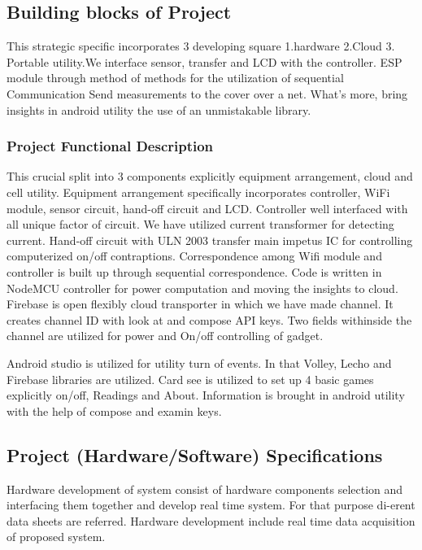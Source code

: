 \documentclass[12pt,a4paper]{article}
\begin{document}
\subsection{Building blocks of Project}
\hspace{0.5cm}This strategic specific incorporates 3 developing square 1.hardware 2.Cloud 3. Portable utility.We interface sensor, transfer and LCD with the controller. ESP module through method of methods for the utilization of sequential Communication Send measurements to the cover over a net. What's more, bring insights in android utility the use of an unmistakable library.\\

\subsubsection{Project Functional Description }
\hspace{0.5cm}This crucial split into 3 components explicitly equipment arrangement, cloud and cell utility. Equipment arrangement specifically incorporates controller, WiFi module, sensor circuit, hand-off circuit and LCD. Controller well interfaced with all unique factor of circuit. We have utilized current transformer for detecting current. Hand-off circuit with ULN 2003 transfer main impetus IC for controlling computerized on/off contraptions. Correspondence among Wifi module and controller is built up through sequential correspondence. Code is written in NodeMCU controller for power computation and moving the insights to cloud.\\

Firebase is open flexibly cloud transporter in which we have made channel. It creates channel ID with look at and compose API keys. Two fields withinside the channel are utilized for power and On/off controlling of gadget. 

Android studio is utilized for utility turn of events. In that Volley, Lecho and Firebase libraries are utilized. Card see is utilized to set up 4 basic games explicitly on/off, Readings and About. Information is brought in android utility with the help of compose and examin keys.

\subsection{Project (Hardware/Software) Specifications}
\hspace{0.5cm} Hardware development of system consist of hardware components selection and interfacing them together and develop real time system. For that purpose di-erent data sheets are referred. Hardware development include real time data acquisition of proposed system.\\
\end{document}

